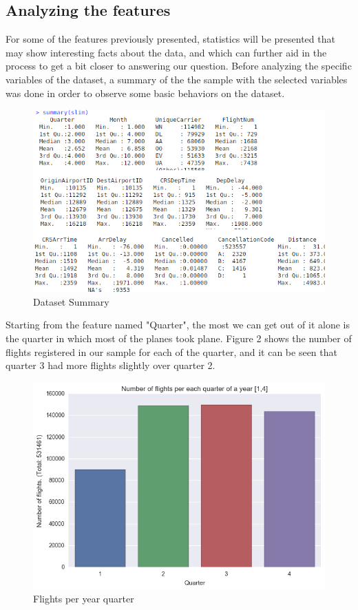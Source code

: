 \documentclass{article}
\begin{document}
    \subsection{Analyzing the features}
    For some of the features previously presented, statistics will be presented that may show interesting
    facts about the data, and which can further aid in the process to get a bit closer to answering our question.\newline
    Before analyzing the specific variables of the dataset, a summary of the the sample with the selected variables was done
    in order to observe some basic behaviors on the dataset.\newline
    \begin{figure}[h!]
      \includegraphics[width=\linewidth]{r_plots/summ.png}
      \caption{Dataset Summary}
      \label{fig:graph1}
    \end{figure}

    Starting from the feature named "Quarter", the most we can get out of it alone is the quarter in which most of the planes
    took plane. Figure 2 shows the number of flights registered in our sample for each of the quarter, and it can be seen
    that quarter 3 had more flights slightly over quarter 2.

    \begin{figure}[h!]
      \includegraphics[width=\linewidth]{graph/quarter_flights.png}
      \caption{Flights per year quarter}
      \label{fig:graph1}
    \end{figure}
\end{document}
